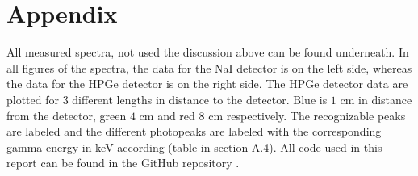 \documentclass[a4paper]{article}
\begin{document}
\newpage

\section{Appendix}

All measured spectra, not used the discussion above can be found underneath. In all figures of the spectra, the data for the NaI detector is on the left side, whereas the data for the HPGe detector is on the right side. The HPGe detector data are plotted for 3 different lengths in distance to the detector. Blue is $1$ cm in distance from the detector, green $4$ cm and red $8$ cm respectively. The recognizable peaks are labeled and the different photopeaks are labeled with the corresponding gamma energy in keV according \cite{instruction_sheet} (table in section A.4).
\newline
All code used in this report can be found in the GitHub repository \cite{github}.
\end{document}

